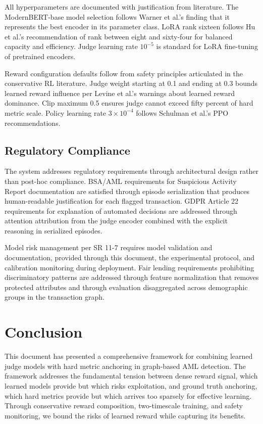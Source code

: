 \documentclass[11pt,a4paper]{article}
\begin{document}
All hyperparameters are documented with justification from literature. The ModernBERT-base model selection follows Warner et al.'s finding that it represents the best encoder in its parameter class. LoRA rank sixteen follows Hu et al.'s recommendation of rank between eight and sixty-four for balanced capacity and efficiency. Judge learning rate $10^{-5}$ is standard for LoRA fine-tuning of pretrained encoders.

Reward configuration defaults follow from safety principles articulated in the conservative RL literature. Judge weight starting at 0.1 and ending at 0.3 bounds learned reward influence per Levine et al.'s warnings about learned reward dominance. Clip maximum 0.5 ensures judge cannot exceed fifty percent of hard metric scale. Policy learning rate $3 \times 10^{-4}$ follows Schulman et al.'s PPO recommendations.

\subsection{Regulatory Compliance}

The system addresses regulatory requirements through architectural design rather than post-hoc compliance. BSA/AML requirements for Suspicious Activity Report documentation are satisfied through episode serialization that produces human-readable justification for each flagged transaction. GDPR Article 22 requirements for explanation of automated decisions are addressed through attention attribution from the judge encoder combined with the explicit reasoning in serialized episodes.

Model risk management per SR 11-7 requires model validation and documentation, provided through this document, the experimental protocol, and calibration monitoring during deployment. Fair lending requirements prohibiting discriminatory patterns are addressed through feature normalization that removes protected attributes and through evaluation disaggregated across demographic groups in the transaction graph.

\section{Conclusion}

This document has presented a comprehensive framework for combining learned judge models with hard metric anchoring in graph-based AML detection. The framework addresses the fundamental tension between dense reward signal, which learned models provide but which risks exploitation, and ground truth anchoring, which hard metrics provide but which arrives too sparsely for effective learning. Through conservative reward composition, two-timescale training, and safety monitoring, we bound the risks of learned reward while capturing its benefits.
\end{document}
